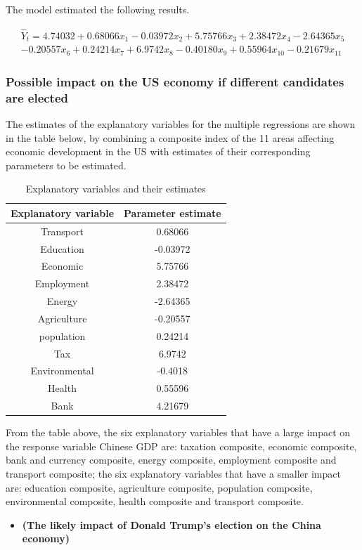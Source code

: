\documentclass{apmcmthesis}
\begin{document}
The model estimated the following results.

\begin{equation}
	\begin{aligned}
		\hat{Y}_t= 4.74032+ 0.68066x_1- 0.03972x_2+ 5.75766x_3+2.38472x_4- 2.64365x_5\\
		- 0.20557x_6+ 0.24214x_7+ 6.9742x_{8}- 0.40180x_{9}+ 0.55964x_{10}- 0.21679x_{11}
	\end{aligned}
\end{equation}

\subsubsection{Possible impact on the US economy if different candidates are elected}

The estimates of the explanatory variables for the multiple regressions are shown in the table below, by combining a composite index of the 11 areas affecting economic development in the US with estimates of their corresponding parameters to be estimated.
\begin{table}[H]
	\caption{Explanatory variables and their estimates}\label{tab:105} \centering
	\begin{tabular}{cc}
		\toprule[1.5pt]
		Explanatory variable & Parameter estimate \\
		\midrule[1pt]
		Transport            & 0.68066            \\
		Education            & -0.03972           \\
		Economic             & 5.75766            \\
		Employment           & 2.38472            \\
		Energy               & -2.64365           \\
		Agriculture          & -0.20557           \\
		population           & 0.24214            \\
		Tax                  & 6.9742             \\
		Environmental        & -0.4018            \\
		Health               & 0.55596            \\
		Bank                 & 4.21679           \\
		\bottomrule[1.5pt]      
	\end{tabular}
\end{table}

From the table above, the six explanatory variables that have a large impact on the response variable Chinese GDP are: taxation composite, economic composite, bank and currency composite, energy composite, employment composite and transport composite; the six explanatory variables that have a smaller impact are: education composite, agriculture composite, population composite, environmental composite, health composite and transport composite.
\begin{itemize}
	\item \textbf{(The likely impact of Donald Trump's election on the China economy)} 
\end{itemize}
\end{document}
